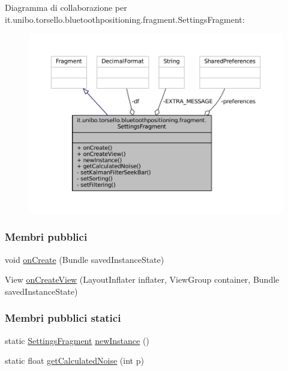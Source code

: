 Diagramma di collaborazione per it.\+unibo.\+torsello.\+bluetoothpositioning.\+fragment.\+Settings\+Fragment\+:
\nopagebreak
\begin{figure}[H]
\begin{center}
\leavevmode
\includegraphics[width=350pt]{classit_1_1unibo_1_1torsello_1_1bluetoothpositioning_1_1fragment_1_1SettingsFragment__coll__graph}
\end{center}
\end{figure}
\subsubsection*{Membri pubblici}
\begin{DoxyCompactItemize}
\item 
void \hyperlink{classit_1_1unibo_1_1torsello_1_1bluetoothpositioning_1_1fragment_1_1SettingsFragment_a7de90efb25e655078f5f8984f7c6d628_a7de90efb25e655078f5f8984f7c6d628}{on\+Create} (Bundle saved\+Instance\+State)
\item 
View \hyperlink{classit_1_1unibo_1_1torsello_1_1bluetoothpositioning_1_1fragment_1_1SettingsFragment_ac1c9d47777382cc2c74b7b1cf3d6ccd7_ac1c9d47777382cc2c74b7b1cf3d6ccd7}{on\+Create\+View} (Layout\+Inflater inflater, View\+Group container, Bundle saved\+Instance\+State)
\end{DoxyCompactItemize}
\subsubsection*{Membri pubblici statici}
\begin{DoxyCompactItemize}
\item 
static \hyperlink{classit_1_1unibo_1_1torsello_1_1bluetoothpositioning_1_1fragment_1_1SettingsFragment}{Settings\+Fragment} \hyperlink{classit_1_1unibo_1_1torsello_1_1bluetoothpositioning_1_1fragment_1_1SettingsFragment_a4eb69c78cde2ba119eb62453688280f5_a4eb69c78cde2ba119eb62453688280f5}{new\+Instance} ()
\item 
static float \hyperlink{classit_1_1unibo_1_1torsello_1_1bluetoothpositioning_1_1fragment_1_1SettingsFragment_a595d859602f34ca81957a0578c1602a6_a595d859602f34ca81957a0578c1602a6}{get\+Calculated\+Noise} (int p)
\end{DoxyCompactItemize}
